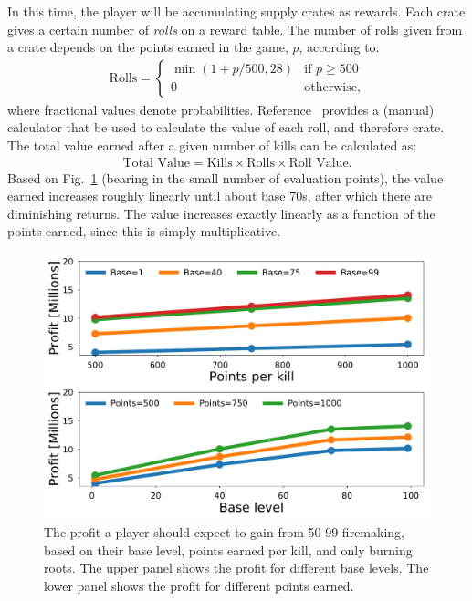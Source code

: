 		In this time, the player will be accumulating supply crates as rewards. Each crate gives a certain number of \emph{rolls} on a reward table. The number of rolls given from a crate depends on the points earned in the game, $p$, according to:
		\begin{align}
			\text{Rolls} = \begin{cases}
				\min(1 + p / 500, 28) & \text{if $p \ge 500$} \\
				0 & \text{otherwise},
			\end{cases}
		\end{align}
		where fractional values denote probabilities. Reference~\cite{wiki:wintertodt_supply_crates} provides a (manual) calculator that be used to calculate the value of each roll, and therefore crate. The total value earned after a given number of kills can be calculated as:
		\begin{align}
			\text{Total Value} = \text{Kills} \times \text{Rolls} \times \text{Roll Value}.
		\end{align}
		Based on Fig.~\ref{fig:wintertodt_profit} (bearing in the small number of evaluation points), the value earned increases roughly linearly until about base 70s, after which there are diminishing returns. The value increases exactly linearly as a function of the points earned, since this is simply multiplicative.

		\begin{figure}
			\centering
			\includegraphics[width=\linewidth]{results/firemaking/profit.pdf}
			\caption{
				The profit a player should expect to gain from 50-99 firemaking, based on their base level, points earned per kill, and only burning roots. The upper panel shows the profit for different base levels. The lower panel shows the profit for different points earned.
			}
			\label{fig:wintertodt_profit}
		\end{figure}

